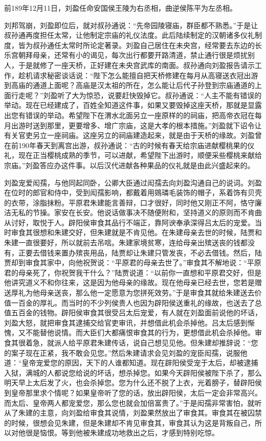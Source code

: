 前189年12月11日，刘盈任命安国侯王陵为右丞相，曲逆侯陈平为左丞相。

刘邦驾崩，刘盈即位后，就对叔孙通说：“先帝园陵寝庙，群臣都不熟悉。”于是让叔孙通再度担任太常，让他制定宗庙的礼仪法度。此后陆续制定的汉朝诸多仪礼制度，皆为叔孙通任太常时所论定著录。刘盈自己居住在未央宫，经常要去东边的长乐宫朝拜母亲，还常有小的谒见，每次出行都要开路清道，禁止通行很是烦扰别人，于是就修了一座天桥，正好建在未央宫武库的南面。叔孙通向刘盈报告请示工作，趁机请求秘密谈话说：“陛下怎么能擅自把天桥修建在每月从高寝送衣冠出游到高庙的通道上面呢？高庙是汉太祖的所在，怎么能让后代子孙登到宗庙通道的上面行走呢？”刘盈听了大为惊恐，说要赶快毁掉它。叔孙通说：“人主不能有错误的举动。现在已经建成了，百姓全知道这件事，如果又要毁掉这座天桥，那就是显露出您有错误的举动。希望陛下在渭水北面另立一座原样的的祠庙，把高帝衣冠在每月出游时送到那里，更要增多、增广宗庙，这是大孝的根本措施。”刘盈就下诏令让有关官吏另立一座祠庙。这座另立的祠庙建造起来，就是由于天桥的缘故。刘盈曾在前190年春天到离宫出游，叔孙通说：“古的时候有春天给宗庙进献樱桃果的仪礼，现在正当樱桃成熟的季节，可以进献，希望陛下出游时，顺便采些樱桃来献给宗庙。”刘盈答应办这件事。以后汉代进献各种果品的仪礼就是由此兴盛起来的。

刘盈宠爱闳孺，与他同起同卧，公卿大臣通过闳孺去向刘盈沟通自己的说词。刘盈在位时的郎官和侍中，受到闳孺影响，都戴着用鵕璘毛装饰的帽子，系着饰有贝壳的衣带，涂脂抹粉。平原君朱建能言善辩，口才很好，同时他又刚正不阿，恪守廉洁无私的节操。家安在长安。他说话做事决不随便附和，坚持道义的原则而不肯曲从讨好，取悦于人。辟阳侯审食其品行不端正，靠阿谀奉承深得吕太后的宠爱。当时审食其很想和朱建交好，但朱建就是不肯见他。在朱建母亲去世的时候，陆贾和朱建一直很要好，所以就前去吊唁。朱建家境贫寒，连给母亲出殡送丧的钱都没有，正要去借钱来置办殡丧用品，陆贾却让朱建只管发丧，不必去借钱。然后，陆贾却到审食其家中，向他祝贺说：“平原君的母亲去世了。”审食其不解地说：“平原君的母亲死了，你祝贺我干什么？”陆贾说道：“以前你一直想和平原君交好，但是他讲究道义不和你往来，这是因为他母亲的缘故。现在他母亲已经去世，您若是赠送厚礼为他母亲送丧，那么他一定愿意为您拼死效劳。”于是审食其就给朱建送去价值一百金的厚礼。而当时的不少列侯贵人也因为辟阳侯送重礼的缘故，也送去了总值五百金的钱物。辟阳侯审食其很受吕太后宠爱，有人就在刘盈面前说他的坏话，刘盈大怒，就把审食其逮捕交给官吏审讯，并想借此机会杀掉他。吕太后感到惭愧，又不能替他说情。而大臣们大都痛恨审食其的行为，更想借此机会杀掉他。审食其很着急，就派人给平原君朱建传话，说自己想见见他。但朱建却推辞说：“您的案子现在正紧，我不敢会见您。”然后朱建请求会见刘盈的宠臣闳孺，说服他道：“皇帝宠爱您的原因，天下的人谁都知道。现在辟阳侯受宠于太后，却被逮捕入狱，满城的人都说您给说的坏话，想杀掉您。如果今天辟阳侯被陛下杀了，那么明天早上太后发了火，也会杀掉您。您为什么还不脱了上衣，光着膀子，替辟阳侯到皇帝那里求个情呢？如果皇帝听了您的话，放出辟阳侯，太后一定会非常高兴。而太后、皇帝两人都宠爱您，那么您也就会加倍富贵了。”于是闳孺非常害怕，就听从了朱建的主意，向刘盈给审食其说情，刘盈果然放出了审食其。审食其在被囚禁的时候，很想会见朱建，但是朱建却不肯见审食其，审食其认为这是背叛自己，所以对他很是恼恨。等到他被朱建成功地救出之后，才感到特别吃惊。


